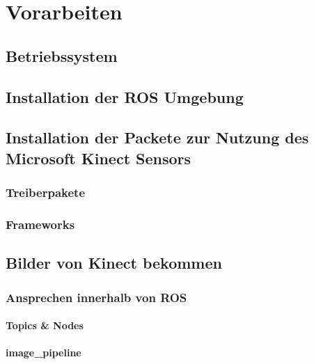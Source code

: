 \chapter{Vorarbeiten}
	\section{Betriebssystem}
	\section{Installation der ROS Umgebung}
	\section{Installation der Packete zur Nutzung des Microsoft Kinect Sensors}
		\subsection{Treiberpakete}
		\subsection{Frameworks}
	\section{Bilder von Kinect bekommen}
	\subsection{Ansprechen innerhalb von ROS}
	\subsubsection{Topics \& Nodes}
	\subsubsection{image\_pipeline}